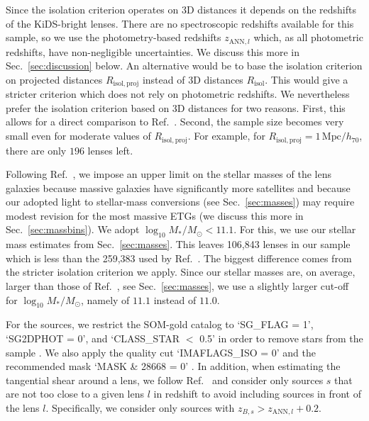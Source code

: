 \documentclass[a4paper,11pt]{article}
\begin{document}
Since the isolation criterion operates on 3D distances it depends on the redshifts of the KiDS-bright lenses.
There are no spectroscopic redshifts available for this sample, so we use the photometry-based redshifts $z_{\mathrm{ANN},l}$ which, as all photometric redshifts, have non-negligible uncertainties.
We discuss this more in Sec.~\ref{sec:discussion} below. 
An alternative would be to base the isolation criterion on projected distances $R_{\mathrm{isol,proj}}$ instead of 3D distances $R_{\mathrm{isol}}$.
This would give a stricter criterion which does not rely on photometric redshifts.
We nevertheless prefer the isolation criterion based on 3D distances for two reasons.
First, this allows for a direct comparison to Ref.~\cite{Brouwer2021}.
Second, the sample size becomes very small even for moderate values of $R_{\mathrm{isol,proj}}$.
For example, for $R_{\mathrm{isol,proj}} = 1\,\mathrm{Mpc}/h_{70}$, there are only $196$ lenses left.

Following Ref.~\cite{Brouwer2021}, we impose an upper limit on the stellar masses of the lens galaxies because massive galaxies have significantly more satellites \citep[see also Sect. 2.2.3 of Ref.][]{Brouwer2017} and because our adopted light to stellar-mass conversions \cite{Schombert2014}
%
(see Sec.~\ref{sec:masses}) may 
%
require modest revision for the most massive ETGs \cite{Schombert2019}
(we discuss this more in Sec.~\ref{sec:massbins}).
%
We adopt $\log_{10} M_\ast/M_\odot < 11.1$.
For this, we use our stellar mass estimates from Sec.~\ref{sec:masses}.
This leaves 106,843 lenses in our sample which is less than the 259,383 used by Ref.~\cite{Brouwer2021}.
The biggest difference comes from the stricter isolation criterion we apply.
Since our stellar masses are, on average, larger than those of Ref.~\cite{Brouwer2021}, see Sec.~\ref{sec:masses}, we use a slightly larger cut-off for $\log_{10} M_\ast/M_\odot$, namely of $11.1$ instead of $11.0$.

For the sources, we restrict the SOM-gold catalog to `SG\_FLAG = 1', `SG2DPHOT = 0', and `CLASS\_STAR $<$ 0.5' in order to remove stars from the sample \citep{Brouwer2021,Kuijken2019}.
We also apply the quality cut `IMAFLAGS\_ISO = 0' and the recommended mask `MASK \& 28668 = 0' \citep{Brouwer2021,Kuijken2019}.
In addition, when estimating the tangential shear around a lens, we follow Ref.~\cite{Brouwer2021} and consider only sources $s$ that are not too close to a given lens $l$ in redshift to avoid including sources in front of the lens $l$.
Specifically, we consider only sources with $z_{B,s} > z_{\mathrm{ANN},l} + 0.2$.
\end{document}
